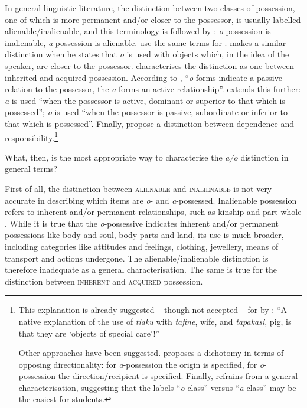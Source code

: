 In general linguistic literature, the distinction between two classes of possession, one of which is more permanent and/or closer to the possessor, is usually labelled alienable/inalienable, and this terminology is followed by \citet[102]{DuFeu1996}: \textit{o}{}-possession is inalienable, \textit{a}{}-possession is alienable. \citet{PukuiElbert1957} use the same terms for . \citet[42]{Englert1978} makes a similar distinction when he states that \textit{o} is used with objects which, in the idea of the speaker, are closer to the possessor. \citet{Hohepa1967} characterises the distinction as one between inherited and acquired possession. According to \citet[145]{Capell1931}, “\textit{o} forms indicate a passive relation to the possessor, the \textit{a} forms an active relationship”. \citet[43]{Biggs1973} extends this further: \textit{a} is used “when the possessor is active, dominant or superior to that which is possessed”; \textit{o} is used “when the possessor is passive, subordinate or inferior to that which is possessed”. Finally, \citet{MulloyRapu1977} propose a distinction between dependence and responsibility.\footnote{\label{fn:304}This explanation is already suggested – though not accepted – for  by \citet[146]{Capell1931}: “A native explanation of the use of \textit{tiaku} with \textit{tafine}, wife, and \textit{tapakasi}, pig, is that they are ‘objects of special care’!”

Other approaches have been suggested. \citet{Bennardo2000Conceptual,Bennardo2000Possessive} proposes a dichotomy in terms of opposing directionality: for \textit{a}{}-possession the origin is specified, for \textit{o}{}-possession the direction/recipient is specified. Finally, \citet{Elbert1969} refrains from a general characterisation, suggesting that the labels “\textit{o}{}-class” versus “\textit{a}{}-class” may be the easiest for students.} 

What, then, is the most appropriate way to characterise the \textit{{\ꞌ}a/o} distinction in general terms?

First of all, the distinction between \textsc{alienable} and \textsc{inalienable} is not very accurate in describing which items are \textit{o}{}- and \textit{a}{}-possessed. Inalienable possession refers to inherent and/or permanent relationships, such as kinship and part-whole \citep[185]{Dryer2007Noun}. While it is true that the \textit{o}{}-possessive indicates inherent and/or permanent possessions like body and soul, body parts and land, its use is much broader, including categories like attitudes and feelings, clothing, jewellery, means of transport and actions undergone. The alienable/inalienable distinction is therefore inadequate as a general characterisation. The same is true for the distinction between \textsc{inherent} and \textsc{acquired} possession.

